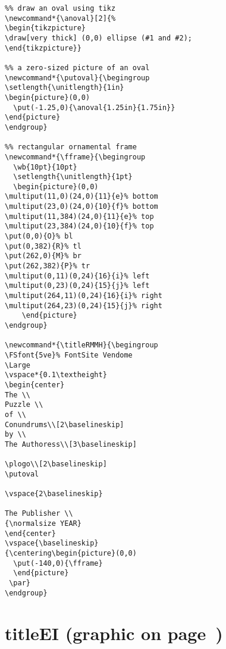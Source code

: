 \documentclass{memoir}
\newcommand*{\wb}[2]{\fontsize{#1}{#2}\usefont{U}{webo}{xl}{n}}
\newcommand*{\FSfont}[1]{%
  \fontencoding{T1}\fontfamily{#1}\selectfont}
\newcommand*{\refit}[1]{(graphic on page~\pageref{#1})}
\newcommand*{\anoval}[2]{%
\begin{tikzpicture}
\draw[very thick] (0,0) ellipse (#1 and #2);
\end{tikzpicture}}
\newcommand*{\putoval}{\begingroup
\setlength{\unitlength}{1in}
\begin{picture}(0,0)
  \put(-1.25,0){\anoval{1.25in}{1.75in}}
\end{picture}
\endgroup}
\newcommand*{\fframe}{\begingroup
  \wb{10pt}{10pt}
  \setlength{\unitlength}{1pt}
  \begin{picture}(0,0)
\multiput(11,0)(24,0){11}{e}%
\multiput(23,0)(24,0){10}{f}%
\multiput(11,384)(24,0){11}{e}%
\multiput(23,384)(24,0){10}{f}%
\put(0,0){O}%
\put(0,382){R}%
\put(262,0){M}%
\put(262,382){P}%
\multiput(0,11)(0,24){16}{i}%
\multiput(0,23)(0,24){15}{j}%
\multiput(264,11)(0,24){16}{i}%
\multiput(264,23)(0,24){15}{j}%
    \end{picture}
\endgroup}
\newcommand*{\titleRMMH}{\begingroup
\FSfont{5ve}%
\Large
\begin{center}
The \\
Puzzle \\
of \\
Conundrums\\[2\baselineskip]
by \\
The Authoress\\[3\baselineskip]
\plogo\\[2\baselineskip]
\putoval

\vspace{2\baselineskip}
The Publisher \\
{\normalsize YEAR}
\end{center}
\vspace{\baselineskip}
\fframe
\endgroup}
\newcommand*{\plogo}{\fbox{$\mathcal{PL}$}}
\begin{document}
\begin{verbatim}
%% draw an oval using tikz
\newcommand*{\anoval}[2]{%
\begin{tikzpicture}
\draw[very thick] (0,0) ellipse (#1 and #2);
\end{tikzpicture}}

%% a zero-sized picture of an oval
\newcommand*{\putoval}{\begingroup
\setlength{\unitlength}{1in}
\begin{picture}(0,0)
  \put(-1.25,0){\anoval{1.25in}{1.75in}}
\end{picture}
\endgroup}

%% rectangular ornamental frame
\newcommand*{\fframe}{\begingroup
  \wb{10pt}{10pt}
  \setlength{\unitlength}{1pt}
  \begin{picture}(0,0)
\multiput(11,0)(24,0){11}{e}% bottom
\multiput(23,0)(24,0){10}{f}% bottom
\multiput(11,384)(24,0){11}{e}% top
\multiput(23,384)(24,0){10}{f}% top
\put(0,0){O}% bl
\put(0,382){R}% tl
\put(262,0){M}% br
\put(262,382){P}% tr
\multiput(0,11)(0,24){16}{i}% left
\multiput(0,23)(0,24){15}{j}% left
\multiput(264,11)(0,24){16}{i}% right
\multiput(264,23)(0,24){15}{j}% right
    \end{picture}
\endgroup}

\newcommand*{\titleRMMH}{\begingroup
\FSfont{5ve}% FontSite Vendome
\Large
\vspace*{0.1\textheight}
\begin{center}
The \\
Puzzle \\
of \\
Conundrums\\[2\baselineskip]
by \\
The Authoress\\[3\baselineskip]

\plogo\\[2\baselineskip]
\putoval

\vspace{2\baselineskip}

The Publisher \\
{\normalsize YEAR}
\end{center}
\vspace{\baselineskip}
{\centering\begin{picture}(0,0)
  \put(-140,0){\fframe}
  \end{picture}
 \par}
\endgroup}
\end{verbatim}

\section{titleEI \refit{EI}}
\end{document}

